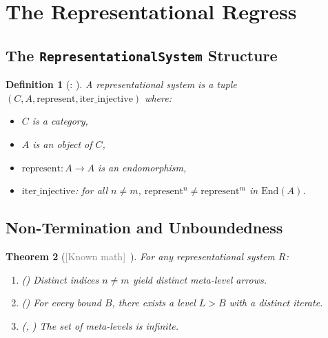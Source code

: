 \documentclass[11pt]{article}
\newtheorem{theorem}{Theorem}[section]
\newtheorem{definition}[theorem]{Definition}
\newcommand{\known}{\textcolor{gray}{[Known math]}}
\begin{document}
\section{The Representational Regress}
\label{sec:regress}

\subsection{The \texttt{RepresentationalSystem} Structure}
\label{sec:repsys}

\begin{definition}[: ]
\leavevmode\par\noindent
A \emph{representational system} is a tuple $(C, A, \mathrm{represent}, \mathrm{iter\_injective})$ where:
\begin{itemize}
\item $C$ is a category,
\item $A$ is an object of $C$,
\item $\mathrm{represent} : A \to A$ is an endomorphism,
\item $\mathrm{iter\_injective}$: for all $n \neq m$, $\mathrm{represent}^n \neq \mathrm{represent}^m$ in $\mathrm{End}(A)$.
\end{itemize}
\end{definition}

\subsection{Non-Termination and Unboundedness}

\begin{theorem}[\known\ ]
\label{thm:regress}
For any representational system $R$:
\begin{enumerate}[label=(\alph*)]
\item () Distinct indices $n \neq m$ yield distinct meta-level arrows.
\item () For every bound $B$, there exists a level $L > B$ with a distinct iterate.
\item (, ) The set of meta-levels is infinite.
\end{enumerate}
\end{theorem}
\end{document}
